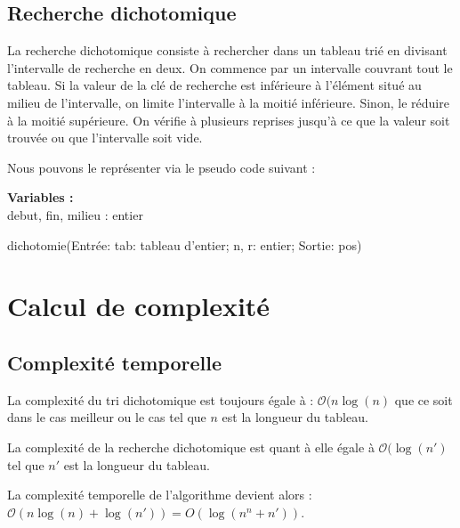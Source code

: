 \subsection{Recherche dichotomique}
La recherche dichotomique consiste à rechercher dans un tableau trié en divisant l'intervalle de recherche en deux.
On commence par un intervalle couvrant tout le tableau. Si la valeur de la clé de recherche est inférieure à l'élément situé au milieu de l'intervalle, on limite l'intervalle à la moitié inférieure. Sinon, le réduire à la moitié supérieure. On vérifie à plusieurs reprises jusqu'à ce que la valeur soit trouvée ou que l'intervalle soit vide.
\par
Nous pouvons le représenter via le pseudo code suivant :

\begin{function}[H]
    \textbf{Variables :}\\
    debut, fin, milieu : entier\;
    \caption{dichotomie(Entrée: tab: tableau d'entier; n, r: entier; Sortie: pos)}
\end{function}

\section{Calcul de complexité}
\subsection{Complexité temporelle}
La complexité du tri dichotomique est toujours égale à : $\mathcal{O}(n \log(n)$ que ce soit dans le cas meilleur ou le cas tel que $n$ est la longueur du tableau.
\par
La complexité de la recherche dichotomique  est quant à elle égale à $\mathcal{O}(\log(n')$ tel que $n'$ est la longueur du tableau.
\par
La complexité temporelle de l'algorithme devient alors : $\mathcal{O}(n \log(n) + \log(n')) = {O}(\log(n^n + n'))$.

